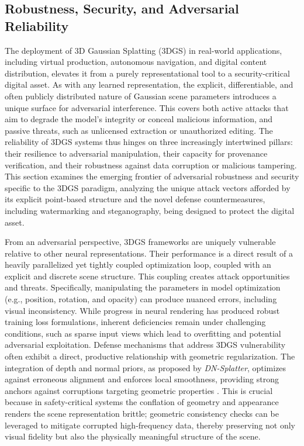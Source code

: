 \documentclass[11pt,a4paper]{article}
\begin{document}
\subsection{Robustness, Security, and Adversarial Reliability}


The deployment of 3D Gaussian Splatting (3DGS) in real-world applications, including virtual production, autonomous navigation, and digital content distribution, elevates it from a purely representational tool to a security-critical digital asset. As with any learned representation, the explicit, differentiable, and often publicly distributed nature of Gaussian scene parameters introduces a unique surface for adversarial interference. This covers both active attacks that aim to degrade the model's integrity or conceal malicious information, and passive threats, such as unlicensed extraction or unauthorized editing. The reliability of 3DGS systems thus hinges on three increasingly intertwined pillars: their resilience to adversarial manipulation, their capacity for provenance verification, and their robustness against data corruption or malicious tampering. This section examines the emerging frontier of adversarial robustness and security specific to the 3DGS paradigm, analyzing the unique attack vectors afforded by its explicit point-based structure and the novel defense countermeasures, including watermarking and steganography, being designed to protect the digital asset.

From an adversarial perspective, 3DGS frameworks are uniquely vulnerable relative to other neural representations. Their performance is a direct result of a heavily parallelized yet tightly coupled optimization loop, coupled with an explicit and discrete scene structure. This coupling creates attack opportunities and threats. Specifically, manipulating the parameters in model optimization (e.g., position, rotation, and opacity) can produce nuanced errors, including visual inconsistency. While progress in neural rendering has produced robust training loss formulations, inherent deficiencies remain under challenging conditions, such as sparse input views which lead to overfitting and potential adversarial exploitation. Defense mechanisms that address 3DGS vulnerability often exhibit a direct, productive relationship with geometric regularization. The integration of depth and normal priors, as proposed by \emph{DN-Splatter}, optimizes against erroneous alignment and enforces local smoothness, providing strong anchors against corruptions targeting geometric properties \cite{arxiv:2603.19682v2}. This is crucial because in safety-critical systems the conflation of geometry and appearance renders the scene representation brittle; geometric consistency checks can be leveraged to mitigate corrupted high-frequency data, thereby preserving not only visual fidelity but also the physically meaningful structure of the scene.
\end{document}
